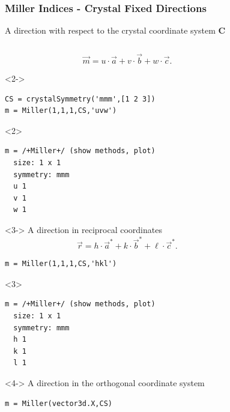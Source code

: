 \documentclass[compress]{beamer}
\begin{document}
\begin{frame}[fragile]
  \frametitle{Miller Indices - Crystal Fixed Directions}

  A direction with respect to the crystal coordinate system  $\mathbf C$

  \begin{columns}
    \begin{column}{7cm}

      \begin{overlayarea}{8cm}{8cm}

        \begin{equation*}
          \vec m = u \cdot \vec a+ v \cdot \vec b + w \cdot \vec c.
        \end{equation*}

    \begin{onlyenv}<2->
\begin{lstlisting}[style=input]
CS = crystalSymmetry('mmm',[1 2 3])
m = Miller(1,1,1,CS,'uvw')
\end{lstlisting}
\end{onlyenv}
\begin{onlyenv}<2>
\vspace{-.3cm}\begin{lstlisting}[style=output]
m = /+Miller+/ (show methods, plot)
  size: 1 x 1
  symmetry: mmm
  u 1
  v 1
  w 1
\end{lstlisting}
\end{onlyenv}

    \begin{onlyenv}<3->
A direction in reciprocal coordinates
\begin{equation*}
  \vec r = h \cdot \vec a^{*}+ k \cdot \vec b^{*} + \ell \cdot \vec c^{*}.
\end{equation*}
\begin{lstlisting}[style=input]
m = Miller(1,1,1,CS,'hkl')
\end{lstlisting}
\end{onlyenv}
\begin{onlyenv}<3>
  \vspace{-.3cm}
  \begin{lstlisting}[style=output]
m = /+Miller+/ (show methods, plot)
  size: 1 x 1
  symmetry: mmm
  h 1
  k 1
  l 1
\end{lstlisting}
\end{onlyenv}

\medskip

\begin{onlyenv}<4->
  A direction in the orthogonal coordinate system
  \begin{lstlisting}[style=input]
m = Miller(vector3d.X,CS)
\end{lstlisting}
\end{onlyenv}
\end{overlayarea}
\end{column}
    \begin{column}{4cm}


\end{column}
\end{columns}
\end{frame}
\end{document}
